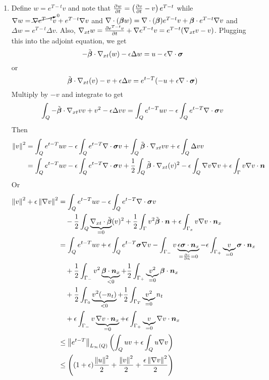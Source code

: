 \documentclass{article}
\begin{document}
\begin{enumerate}
\item Define $w=e^{T-t}v$ and note that $\frac{\partial w}{\partial t}=\left( \frac{\partial v}{\partial t}-v \right)e^{T-t}$ while $\nabla w=\cancelto{0}{\nabla e^{T-t}} v+e^{T-t}\nabla v$ and
$\nabla\cdot(\boldsymbol\beta w)=\nabla\cdot(\boldsymbol\beta)e^{T-t} v+\boldsymbol\beta\cdot e^{T-t}\nabla v$ and $\Delta w=e^{T-t}\Delta v$. 
Also, $\nabla_{xt} w=\frac{\partial e^{T-t} v}{\partial t}+\nabla{e^{T-t} v}=e^{T-t}(\nabla_{xt} v-v)$.
Plugging this into the adjoint equation, we get
\begin{equation*}
-\tilde{\boldsymbol\beta}\cdot\nabla_{xt}(w)-\epsilon\Delta w=u-\epsilon\nabla\cdot\boldsymbol\sigma
\end{equation*}
or 
\begin{equation*}
\tilde{\boldsymbol\beta}\cdot\nabla_{xt}(v)-v+\epsilon\Delta v=e^{t-T}(-u+\epsilon\nabla\cdot\boldsymbol\sigma)
\end{equation*}
Multiply by $-v$ and integrate to get
\begin{align*}
\int_Q-\tilde{\boldsymbol\beta}\cdot\nabla_{xt} vv+v^2-\epsilon\Delta vv=\int_Qe^{t-T}uv-\epsilon\int_Qe^{t-T}\nabla\cdot\boldsymbol\sigma v
\end{align*}
Then
\begin{align*}
\norm{v}^2&=\int_Qe^{t-T}uv
-\epsilon\int_Qe^{t-T}\Div\bfsigma v
+\int_Q\tilde\bfbeta\cdot\Gradxt vv
+\epsilon\int_Q\Delta vv\\
%
&=\int_Qe^{t-T}uv
-\epsilon\int_Qe^{t-T}\Div\bfsigma v
+\frac{1}{2}\int_Q\tilde\bfbeta\cdot\Gradxt(v)^2
-\epsilon\int_Q\Grad v\Grad v
+\epsilon\int_\Gamma v\Grad v\cdot\bfn
\\
\end{align*}
Or
\begin{align*}
\left\| v \right\|^2+\epsilon\left\| \nabla v \right\|^2&=\int_Qe^{t-T}uv
-\epsilon\int_Qe^{t-T}\nabla\cdot\boldsymbol\sigma v\\
&\quad-\frac{1}{2}\int_Q\underbrace{\nabla_{xt}\cdot\tilde{\boldsymbol\beta}}_{=0}(v)^2
+\frac{1}{2}\int_\Gamma v^2\tilde{\boldsymbol\beta}\cdot\boldsymbol n
+\epsilon\int_{\Gamma_x} v\nabla v\cdot\boldsymbol n_x
\\
&=\int_Qe^{t-T}uv
+\epsilon\int_Qe^{t-T}\boldsymbol\sigma\nabla v
-\int_{\Gamma_-}v\underbrace{\epsilon\boldsymbol\sigma\cdot\boldsymbol n_x}_{=\frac{\partial v}{\partial n}=0}
-\epsilon\int_{\Gamma_+}\underbrace{v}_{=0}\boldsymbol\sigma\cdot\boldsymbol n_x\\
&\quad+\frac{1}{2}\int_{\Gamma_-} v^2\underbrace{\boldsymbol\beta\cdot\boldsymbol n_x}_{<0}
+\frac{1}{2}\int_{\Gamma_+} \underbrace{v^2}_{=0}\boldsymbol\beta\cdot\boldsymbol n_x\\
&\quad+\frac{1}{2}\int_{\Gamma_0} \underbrace{v^2 (-n_t)}_{<0}
+\frac{1}{2}\int_{\Gamma_T} \underbrace{v^2}_{=0} n_t\\
&\quad+\epsilon\int_{\Gamma_-} v\underbrace{\nabla v\cdot\boldsymbol n_x}_{=0}
+\epsilon\int_{\Gamma_+} \underbrace{v}_{=0}\nabla v\cdot\boldsymbol n_x
\\
&\leq \left\| e^{t-T} \right\|_{L_\infty(Q)}\left( \int_Quv+\epsilon\int_Qu\nabla v \right)
\\
&\leq \left( (1+\epsilon)\frac{\left\| u \right\|^2}{2}+\frac{\left\| v \right\|^2}{2}+\frac{\epsilon\left\| \nabla v \right\|^2}{2} \right)
\\
\end{align*}
\end{enumerate}
\end{document}
